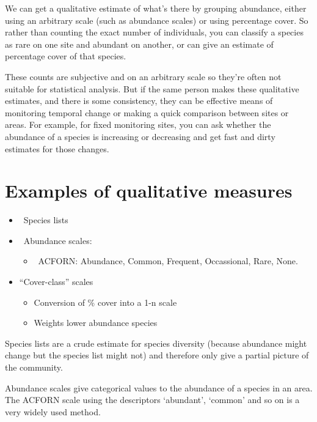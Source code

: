 \documentclass[
  letterpaper,
  DIV=11,
  numbers=noendperiod]{scrreprt}
\providecommand{\tightlist}{%
  \setlength{\itemsep}{0pt}\setlength{\parskip}{0pt}}
\begin{document}
We can get a qualitative estimate of what's there by grouping abundance,
either using an arbitrary scale (such as abundance scales) or using
percentage cover. So rather than counting the exact number of
individuals, you can classify a species as rare on one site and abundant
on another, or can give an estimate of percentage cover of that species.

These counts are subjective and on an arbitrary scale so they're often
not suitable for statistical analysis. But if the same person makes
these qualitative estimates, and there is some consistency, they can be
effective means of monitoring temporal change or making a quick
comparison between sites or areas. For example, for fixed monitoring
sites, you can ask whether the abundance of a species is increasing or
decreasing and get fast and dirty estimates for those changes.

\section{Examples of qualitative
measures}\label{examples-of-qualitative-measures}

\begin{itemize}
\tightlist
\item
  ~Species lists
\item
  ~Abundance scales:

  \begin{itemize}
  \tightlist
  \item
    ~ACFORN: Abundance, Common, Frequent, Occassional, Rare, None.
  \end{itemize}
\item
  ``Cover-class'' scales

  \begin{itemize}
  \tightlist
  \item
    Conversion of \% cover into a 1-n scale
  \item
    Weights lower abundance species
  \end{itemize}
\end{itemize}

Species lists are a crude estimate for species diversity (because
abundance might change but the species list might not) and therefore
only give a partial picture of the community.

Abundance scales give categorical values to the abundance of a species
in an area. The ACFORN scale using the descriptors `abundant', `common'
and so on is a very widely used method.
\end{document}
